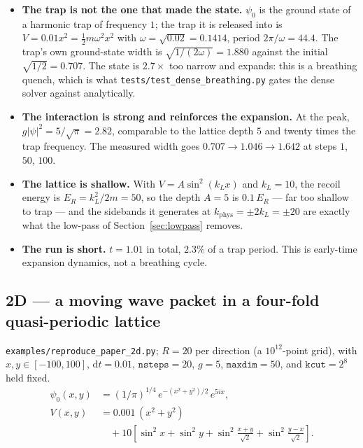 \documentclass[11pt,a4paper]{article}
\newcommand{\code}[1]{\texttt{#1}}
\newcommand{\kph}{k_{\mathrm{phys}}}
\newcommand{\dd}{\mathrm{d}}
\begin{document}
\begin{itemize}[leftmargin=1.2em]
\item \textbf{The trap is not the one that made the state.} $\psi_0$ is the ground
  state of a harmonic trap of frequency $1$; the trap it is released into is
  $V = 0.01x^2 = \tfrac{1}{2}m\omega^2 x^2$ with $\omega = \sqrt{0.02} = 0.1414$,
  period $2\pi/\omega = 44.4$. The trap's own ground-state width is
  $\sqrt{1/(2\omega)} = 1.880$ against the initial $\sqrt{1/2} = 0.707$. The state is
  $2.7\times$ too narrow and expands: this is a breathing quench, which is what
  \code{tests/test\_dense\_breathing.py} gates the dense solver against analytically.
\item \textbf{The interaction is strong and reinforces the expansion.} At the peak,
  $g|\psi|^2 = 5/\sqrt{\pi} = 2.82$, comparable to the lattice depth $5$ and twenty
  times the trap frequency. The measured width goes
  $0.707 \rightarrow 1.046 \rightarrow 1.642$ at steps $1$, $50$, $100$.
\item \textbf{The lattice is shallow.} With $V = A\sin^2(k_L x)$ and $k_L = 10$, the
  recoil energy is $E_R = k_L^2/2m = 50$, so the depth $A = 5$ is $0.1\,E_R$ --- far
  too shallow to trap --- and the sidebands it generates at $\kph = \pm 2k_L = \pm 20$
  are exactly what the low-pass of Section~\ref{sec:lowpass} removes.
\item \textbf{The run is short.} $t = 1.01$ in total, $2.3\%$ of a trap period. This
  is early-time expansion dynamics, not a breathing cycle.
\end{itemize}

\subsection{2D --- a moving wave packet in a four-fold quasi-periodic lattice}

\code{examples/reproduce\_paper\_2d.py}; $R = 20$ per direction (a $10^{12}$-point
grid), with $x, y \in [-100, 100]$, $\dd t = 0.01$, $\code{nsteps} = 20$,
$g = 5$, $\code{maxdim} = 50$, and $\code{kcut} = 2^8$ held fixed.
\begin{align}
  \psi_0(x,y) &= (1/\pi)^{1/4}\,e^{-(x^2+y^2)/2}\,e^{5ix}, \\
  V(x,y)      &= 0.001\,(x^2+y^2) \nonumber\\
              &\quad + 10\left[\sin^2 x + \sin^2 y
                 + \sin^2\!\frac{x+y}{\sqrt{2}}
                 + \sin^2\!\frac{y-x}{\sqrt{2}}\right].
\end{align}
\end{document}
